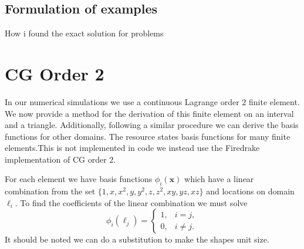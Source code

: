 \documentclass[12pt,a4paper]{article}
\begin{document}
\subsection{Formulation of examples}
How i found the exact solution for problems 
\section{CG Order 2}
In our numerical simulations we use a continuous Lagrange order $2$ finite element. We now provide a method for the derivation of this finite element on an interval and a triangle. Additionally, following a similar procedure we can derive the basis functions for other domains. The resource \cite{} states basis functions for many finite elements.This is not implemented in code we instead use the Firedrake implementation of CG order $2$. 

For each element we have basis functions $\phi_i(\mathbf{x})$ which have a linear combination from the set $\{1, x, x^2, y, y^2, z, z^2, xy, yz, xz\}$ and locations on domain $\ell_i$.  To find the coefficients of the linear combination we must solve
\begin{equation} \label{CG_eq}
\phi_i(\ell_j) =
\begin{cases}
1, &i=j,\\
0, &i\neq j.
\end{cases}
\end{equation}
It should be noted we can do a substitution to make the shapes unit size.
\end{document}
